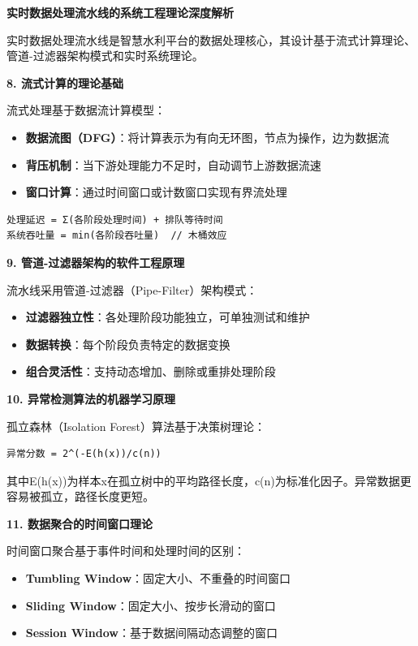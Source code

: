 \textbf{实时数据处理流水线的系统工程理论深度解析}

实时数据处理流水线是智慧水利平台的数据处理核心，其设计基于流式计算理论、管道-过滤器架构模式和实时系统理论。

\textbf{8. 流式计算的理论基础}

流式处理基于数据流计算模型：

\begin{itemize}
\tightlist
\item
  \textbf{数据流图（DFG）}：将计算表示为有向无环图，节点为操作，边为数据流
\item
  \textbf{背压机制}：当下游处理能力不足时，自动调节上游数据流速
\item
  \textbf{窗口计算}：通过时间窗口或计数窗口实现有界流处理
\end{itemize}

\begin{lstlisting}
处理延迟 = Σ(各阶段处理时间) + 排队等待时间
系统吞吐量 = min(各阶段吞吐量)  // 木桶效应
\end{lstlisting}

\textbf{9. 管道-过滤器架构的软件工程原理}

流水线采用管道-过滤器（Pipe-Filter）架构模式：

\begin{itemize}
\tightlist
\item
  \textbf{过滤器独立性}：各处理阶段功能独立，可单独测试和维护
\item
  \textbf{数据转换}：每个阶段负责特定的数据变换
\item
  \textbf{组合灵活性}：支持动态增加、删除或重排处理阶段
\end{itemize}

\textbf{10. 异常检测算法的机器学习原理}

孤立森林（Isolation Forest）算法基于决策树理论：

\begin{lstlisting}
异常分数 = 2^(-E(h(x))/c(n))
\end{lstlisting}

其中E(h(x))为样本x在孤立树中的平均路径长度，c(n)为标准化因子。异常数据更容易被孤立，路径长度更短。

\textbf{11. 数据聚合的时间窗口理论}

时间窗口聚合基于事件时间和处理时间的区别：

\begin{itemize}
\tightlist
\item
  \textbf{Tumbling Window}：固定大小、不重叠的时间窗口
\item
  \textbf{Sliding Window}：固定大小、按步长滑动的窗口\\
\item
  \textbf{Session Window}：基于数据间隔动态调整的窗口
\end{itemize}

